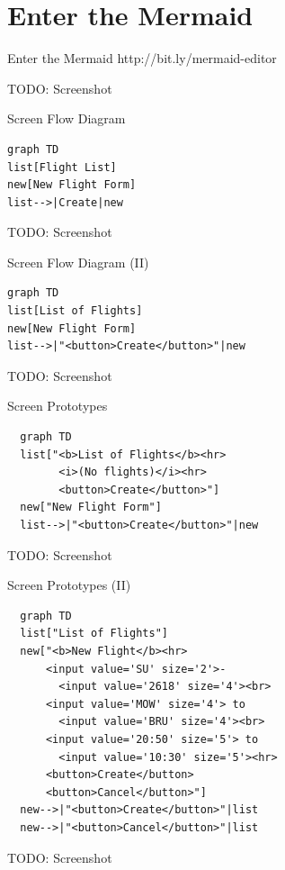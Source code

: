 \documentclass[aspectratio=43,handout,bigger]{beamer}
\begin{document}
\section{Enter the Mermaid}

\begin{frame}{Enter the Mermaid}
  http://bit.ly/mermaid-editor

  TODO: Screenshot
\end{frame}


\begin{frame}[fragile]{Screen Flow Diagram}
\begin{verbatim}
graph TD
list[Flight List]
new[New Flight Form]
list-->|Create|new
\end{verbatim}

  TODO: Screenshot
\end{frame}


\begin{frame}[fragile]{Screen Flow Diagram (II)}
\begin{verbatim}
graph TD
list[List of Flights]
new[New Flight Form]
list-->|"<button>Create</button>"|new
\end{verbatim}

  TODO: Screenshot
\end{frame}


\begin{frame}[fragile]{Screen Prototypes}
  \begin{verbatim}
  graph TD
  list["<b>List of Flights</b><hr>
        <i>(No flights)</i><hr>
        <button>Create</button>"]
  new["New Flight Form"]
  list-->|"<button>Create</button>"|new
  \end{verbatim}

  TODO: Screenshot
\end{frame}


\begin{frame}[fragile]{Screen Prototypes (II)}
  \begin{verbatim}
  graph TD
  list["List of Flights"]
  new["<b>New Flight</b><hr>
      <input value='SU' size='2'>-
        <input value='2618' size='4'><br>
      <input value='MOW' size='4'> to
        <input value='BRU' size='4'><br>
      <input value='20:50' size='5'> to
        <input value='10:30' size='5'><hr>
      <button>Create</button>
      <button>Cancel</button>"]
  new-->|"<button>Create</button>"|list
  new-->|"<button>Cancel</button>"|list
  \end{verbatim}

  TODO: Screenshot
\end{frame}
\end{document}
